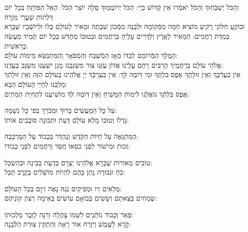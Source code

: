 \documentclass[twoside, openany, parskip=half, 11pt]{book}
\begin{document}
\\
\\
\shatz {}
 וְהַכֹּל יְשַׁבְּֿחֽוּךָ וְהַכֹּל יֹאמְֿרוּ אֵין קָדוֹשׁ כַּיָי:\hfill \break
 \kahal הַכֹּל יְרוֹמֲמֽוּךָ סֶּֽלָה יוֹצֵר הַכֹּל: הָאֵל הַפּוֹתֵֽחַ בְּכָל יוֹם דַּלְתוֹת שַׁעֲרֵי מִזְרָח\\
 \shatz וּבוֹקֵֽעַ חַלּוֹנֵי רָקִֽיעַ מוֹצִיא חַמָּה מִמְּֿקוֹמָהּ וּלְבָנָה מִמְּֿכוֹן שִׁבְתָּהּ 
 \kahal וּמֵאִיר לָעוֹלָם כֻּלּוֹ וּלְיוֹשְֿׁבָיו שֶׁבָּרָא בְּמִדַּת רַחֲמִים: \hfill \break
 \shatz הַמֵּאִיר לָאָֽרֶץ וְלַדָּרִים עָלֶֽיהָ בְּרַחֲמִים וּבְטוּבוֹ מְחַדֵּשׁ בְּכָל יוֹם תָּמִיד מַעֲשֵׂה בְרֵאשִׁית: \\
 \kahal הַמֶּֽלֶךְ הַמְּֿרוֹמָם לְבַדּוֹ מֵאָז הַמְֿשֻׁבָּח וְהַמְֿפֹאָר וְהַמִּתְנַשֵּׂא מִימוֹת עוֹלָם: \\
 \shatz אֱלֹהֵי עוֹלָם בְּרַחֲמֶֽיךָ הָרַבִּים רַחֵם עָלֵֽינוּ אֲדוֹן עֻזֵּֽנוּ צוּר מִשְׂגַּבֵּֽנוּ מָגֵן יִשְׁעֵֽנוּ מִשְׂגָּב בַּעֲדֵֽנוּ: \\
 \kahal אֵין כְּעֶרְֿכֶּֽךָ וְאֵין זוּלָתֶֽךָ אֶפֶס בִּלְתֶּֽךָ וּמִי דּֽוֹמֶה לָּךְ: \hfill \break
 \shatz אֵין כְּעֶרְכְּֿךָ יְיָ אֱלֹהֵֽינוּ בָּעוֹלָם הַזֶּה וְאֵין זוּלָתְֿךָ מַלְכֵּֽנוּ לְחַיֵּי הָעוֹלָם הַבָּא:\\
 \kahal אֶֽפֶס בִּלְתְּֿךָ גּוֹאֲלֵֽנוּ לִימוֹת הַמָּשִֽׁיחַ וְאֵין דּֽוֹמֶה לְּךָ מוֹשִׁיעֵֽנוּ לִתְחִיַּת הַמֵּתִים:

\shatz {}
 עַל כָּל הַמַּעֲשִׂים \hfill בָּרוּךְ וּמְבֹרָךְ בְּפִי כָּל נְשָׁמָה: \\
\kahal גָּדְלוֹ וְטוּבוֹ מָלֵא עוֹלָם \hfill דַּֽעַת וּתְבוּנָה סוֹבֲבִים אוֹתוֹ:

\shatz הַמִּתְגָּאֶה עַל חַיּוֹת הַקֹּֽדֶשׁ \hfill וְנֶהְדָּר בְּכָבוֹד עַל הַמֶּרְכָּבָה:\\
\kahal זְכוּת וּמִישׁוֹר לִפְנֵי כִסְאוֹ \hfill חֶֽסֶד וְרַחֲמִים לִפְנֵי כְבוֹדוֹ: 

\shatz טוֹבִים מְאוֹרוֹת שֶׁבָּרָא אֱלֹהֵֽינוּ \hfill 	יְצָרָם בְּדַֽעַת בְּבִינָה וּבְהַשְׂכֵּל:\\
\kahal כֹּֽחַ וּגְבוּרָה נָתַן בָּהֶם \hfill לִהְיוֹת מוֹשְֿׁלִים בְּקֶֽרֶב תֵּבֵל:

\shatz מְלֵאִים זִיו וּמְפִיקִים נֹֽגַהּ \hfill נָאֶה זִיוָם בְּכָל הָעוֹלָם: \\
\kahal שְׂמֵחִים בְּצֵאתָם וְשָׂשִׂים בְּבוֹאָם \hfill עוֹשִׂים בְּאֵימָה רְצוֹן קוׂנֵיהֶם:
 
\shatz פְּאֵר וְכָבוֹד נוֹתְֿנִים לִשְׁמוֹ \hfill צָהֳלָה וְרִנָּה לְזֵֽכֶר מַלְכוּתוֹ: \\
\kahal קָרָא לַשֶּֽׁמֶשׁ וַיִּזְרַח אוֹר \hfill רָאָה וְהִתְקִין צוּרַת הַלְּֿבָנָה:
\end{document}
